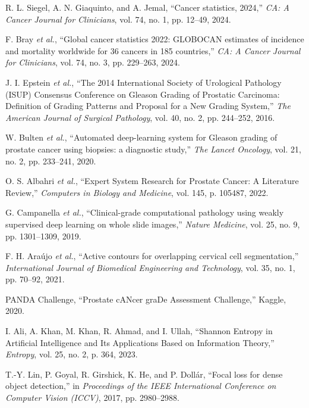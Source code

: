  R. L. Siegel, A. N. Giaquinto, and A. Jemal, ``Cancer statistics, 2024,'' \textit{CA: A Cancer Journal for Clinicians}, vol. 74, no. 1, pp. 12--49, 2024.

 F. Bray \textit{et al.}, ``Global cancer statistics 2022: GLOBOCAN estimates of incidence and mortality worldwide for 36 cancers in 185 countries,'' \textit{CA: A Cancer Journal for Clinicians}, vol. 74, no. 3, pp. 229--263, 2024.

 J. I. Epstein \textit{et al.}, ``The 2014 International Society of Urological Pathology (ISUP) Consensus Conference on Gleason Grading of Prostatic Carcinoma: Definition of Grading Patterns and Proposal for a New Grading System,'' \textit{The American Journal of Surgical Pathology}, vol. 40, no. 2, pp. 244--252, 2016.

 W. Bulten \textit{et al.}, ``Automated deep-learning system for Gleason grading of prostate cancer using biopsies: a diagnostic study,'' \textit{The Lancet Oncology}, vol. 21, no. 2, pp. 233--241, 2020.

 O. S. Albahri \textit{et al.}, ``Expert System Research for Prostate Cancer: A Literature Review,'' \textit{Computers in Biology and Medicine}, vol. 145, p. 105487, 2022.

 G. Campanella \textit{et al.}, ``Clinical-grade computational pathology using weakly supervised deep learning on whole slide images,'' \textit{Nature Medicine}, vol. 25, no. 9, pp. 1301--1309, 2019.

 F. H. Araújo \textit{et al.}, ``Active contours for overlapping cervical cell segmentation,'' \textit{International Journal of Biomedical Engineering and Technology}, vol. 35, no. 1, pp. 70--92, 2021.

 PANDA Challenge, ``Prostate cANcer graDe Assessment Challenge,'' Kaggle, 2020.

 I. Ali, A. Khan, M. Khan, R. Ahmad, and I. Ullah, ``Shannon Entropy in Artificial Intelligence and Its Applications Based on Information Theory,'' \textit{Entropy}, vol. 25, no. 2, p. 364, 2023.

 T.-Y. Lin, P. Goyal, R. Girshick, K. He, and P. Dollár, ``Focal loss for dense object detection,'' in \textit{Proceedings of the IEEE International Conference on Computer Vision (ICCV)}, 2017, pp. 2980--2988.

